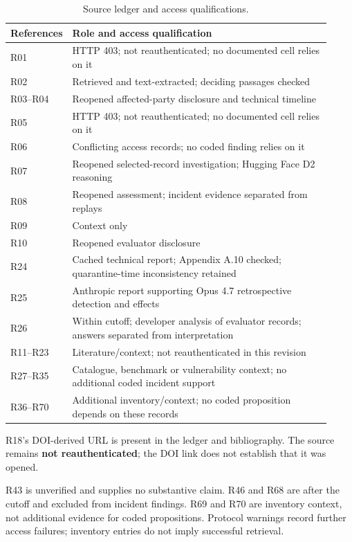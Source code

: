 \documentclass[conference]{IEEEtran}
\begin{document}
\begin{table}[t]\centering\small
\setlength{\tabcolsep}{4pt}
\caption{Source ledger and access qualifications.}
\begin{tabular}{>{\raggedright\arraybackslash}p{0.089\linewidth}>{\raggedright\arraybackslash}p{0.831\linewidth}}
\toprule
References & Role and access qualification \\
\midrule
R01 & HTTP 403; not reauthenticated; no documented cell relies on it \\
R02 & Retrieved and text-extracted; deciding passages checked \\
R03--R04 & Reopened affected-party disclosure and technical timeline \\
R05 & HTTP 403; not reauthenticated; no documented cell relies on it \\
R06 & Conflicting access records; no coded finding relies on it \\
R07 & Reopened selected-record investigation; Hugging Face D2 reasoning \\
R08 & Reopened assessment; incident evidence separated from replays \\
R09 & Context only \\
R10 & Reopened evaluator disclosure \\
R24 & Cached technical report; Appendix A.10 checked; quarantine-time inconsistency retained \\
R25 & Anthropic report supporting Opus 4.7 retrospective detection and effects \\
R26 & Within cutoff; developer analysis of evaluator records; answers separated from interpretation \\
R11--R23 & Literature/context; not reauthenticated in this revision \\
R27--R35 & Catalogue, benchmark or vulnerability context; no additional coded incident support \\
R36--R70 & Additional inventory/context; no coded proposition depends on these records \\
\bottomrule
\end{tabular}
\end{table}

R18's DOI-derived URL is present in the ledger and bibliography. The source remains \textbf{not reauthenticated}; the DOI link does not establish that it was opened.

R43 is unverified and supplies no substantive claim. R46 and R68 are after the cutoff and excluded from incident findings. R69 and R70 are inventory context, not additional evidence for coded propositions. Protocol warnings record further access failures; inventory entries do not imply successful retrieval.
\end{document}
